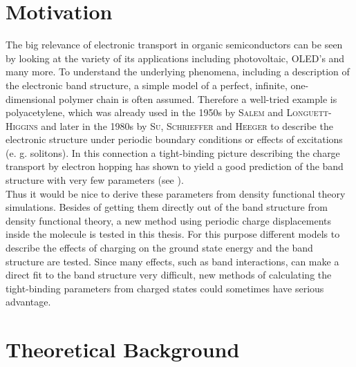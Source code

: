 \section{Motivation}
The big relevance of electronic transport in organic semiconductors can be seen by looking at the variety of its applications including photovoltaic, OLED's and many more. To understand the underlying phenomena, including a description of the electronic band structure, a simple model of a perfect, infinite, one-dimensional polymer chain is often assumed. Therefore a well-tried example is polyacetylene, which was already used in the 1950s by \textsc{Salem} and \textsc{Longuett-Higgins} and later in the 1980s by \textsc{Su, Schrieffer} and \textsc{Heeger} to describe the electronic structure under periodic boundary conditions or effects of excitations (e. g. solitons). In this connection a tight-binding picture describing the charge transport by electron hopping has shown to yield a good prediction of the band structure with very few parameters (see \cite{koehler2015electronic,Longuet-Higgins172,PhysRevLett.42.1698}).\\
Thus it would be nice to derive these parameters from density functional theory simulations. Besides of getting them directly out of the band structure from density functional theory, a new method using periodic charge displacements inside the molecule is tested in this thesis. For this purpose different models to describe the effects of charging on the ground state energy and the band structure are tested. Since many effects, such as band interactions, can make a direct fit to the band structure very difficult, new methods of calculating the tight-binding parameters from charged states could sometimes have serious advantage.

\section{Theoretical Background}

